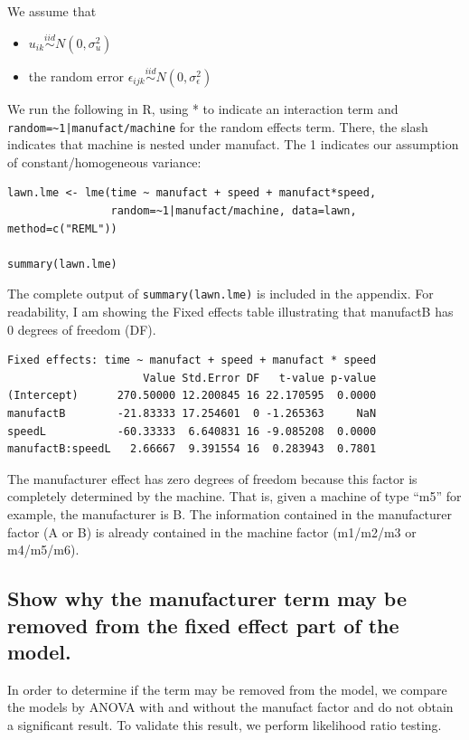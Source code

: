 \documentclass[11pt]{article}
\begin{document}
We assume that 
\begin{itemize}
\item $u_{ik}\overset{iid}\sim N(0,\sigma^2_u)$
\item the random error $\epsilon_{ijk}\overset{iid}\sim
   N(0,\sigma^2_\epsilon)$
\end{itemize}









We run the following in R, using * to indicate an interaction term
and \verb,random=~1|manufact/machine, for the random effects term. There,
the slash indicates that machine is nested under manufact. The 1
indicates our assumption of constant/homogeneous variance:


\begin{verbatim}
lawn.lme <- lme(time ~ manufact + speed + manufact*speed, 
                random=~1|manufact/machine, data=lawn, method=c("REML"))

summary(lawn.lme)
\end{verbatim}

The complete output of \verb~summary(lawn.lme)~ is included in the
appendix. For readability, I am showing the Fixed effects table
illustrating that manufactB has 0 degrees of freedom (DF).


\begin{verbatim}
Fixed effects: time ~ manufact + speed + manufact * speed 
                     Value Std.Error DF   t-value p-value
(Intercept)      270.50000 12.200845 16 22.170595  0.0000
manufactB        -21.83333 17.254601  0 -1.265363     NaN
speedL           -60.33333  6.640831 16 -9.085208  0.0000
manufactB:speedL   2.66667  9.391554 16  0.283943  0.7801
\end{verbatim}

The manufacturer effect has zero degrees of freedom because this
factor is completely determined by the machine. That is, given a
machine of type ``m5'' for example, the manufacturer is B. The
information contained in the manufacturer factor (A or B) is already
contained in the machine factor (m1/m2/m3 or m4/m5/m6).
\subsection{Show why the manufacturer term may be removed from the fixed effect part of the model.}
\label{sec-2-2}


In order to determine if the term may be removed from the model, we
compare the models by ANOVA with and without the manufact factor and 
do not obtain a significant result. To validate this result, we
perform likelihood ratio testing.
\end{document}
